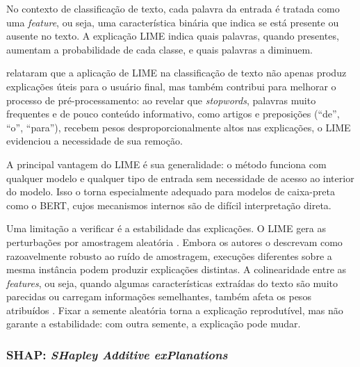 \documentclass[
    12pt,                %
    openright,           %
    oneside,             %
    a4paper,             %
    english,             %
    brazil               %
]{abntex2}
\begin{document}
\label{subsubsec:lime_texto}

No contexto de classificação de texto, cada palavra da entrada é tratada como uma \textit{feature}, ou seja, uma característica binária que indica se está presente ou ausente no texto. A explicação LIME indica quais palavras, quando presentes, aumentam a probabilidade de cada classe, e quais palavras a diminuem.

 relataram que a aplicação de LIME na 
classificação de texto não apenas produz explicações úteis para o 
usuário final, mas também contribui para melhorar o processo de 
pré-processamento: ao revelar que \textit{stopwords}, palavras muito 
frequentes e de pouco conteúdo informativo, como artigos e preposições 
(``de'', ``o'', ``para''), recebem pesos desproporcionalmente altos 
nas explicações, o LIME evidenciou a necessidade de sua remoção.

\label{subsubsec:lime_limitacoes}

A principal vantagem do LIME é sua generalidade: o método funciona com qualquer modelo e qualquer tipo de entrada sem necessidade de acesso ao interior do modelo. Isso o torna especialmente adequado para modelos de caixa-preta como o BERT, cujos mecanismos internos são de difícil interpretação direta.

Uma limitação a verificar é a estabilidade das explicações. O LIME gera as perturbações por amostragem aleatória \cite{ribeiro2016}. Embora os autores o descrevam como razoavelmente robusto ao ruído de amostragem, execuções diferentes sobre a mesma instância podem produzir explicações distintas. A colinearidade entre as \textit{features}, ou seja, quando algumas características extraídas do texto são muito parecidas ou carregam informações semelhantes, também afeta os pesos atribuídos \cite{salih2023}. Fixar a semente aleatória torna a explicação reprodutível, mas não garante a estabilidade: com outra semente, a explicação pode mudar.

\subsubsection{SHAP: \textit{SHapley Additive exPlanations}}
\label{subsec:shap}

\label{subsubsec:shap_fundamentos}
\end{document}
